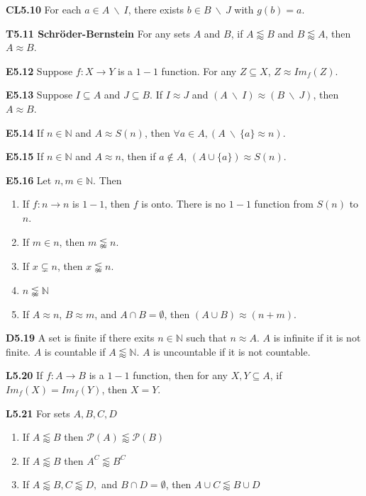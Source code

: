\documentclass[10pt, landscape]{article}
\begin{document}
\begin{multicols*}{3}
\textbf{CL5.10} For each $a \in A \ \backslash \ I$, there exists $b \in B \ \backslash \ J$ with $g(b)=a$.

\textbf{T5.11 Schröder-Bernstein} For any sets $A$ and $B$, if $A \lessapprox B$ and $B \lessapprox A$, then $A \approx B$.

\textbf{E5.12} Suppose $f:X \rightarrow Y$ is a $1-1$ function. For any $Z \subseteq X$, $Z \approx Im_f(Z)$.

\textbf{E5.13} Suppose $I \subseteq A$ and $J \subseteq B$. If $I \approx J$ and $(A \ \backslash \ I) \approx (B \ \backslash \ J)$, then $A \approx B$.

\textbf{E5.14} If $n \in \mathbb{N}$ and $A \approx S(n)$, then $\forall a \in A, ( A \ \backslash \ \{a\} \approx n)$.

\textbf{E5.15} If $n \in \mathbb{N}$ and $A \approx n$, then if $a \notin A$, $(A \cup \{a\}) \approx S(n)$.

\textbf{E5.16} Let $n, m \in \mathbb{N}$. Then
\begin{enumerate}
    \item If $f:n \rightarrow n$ is $1-1$, then $f$ is onto. There is no $1-1$ function from $S(n)$ to $n$.
    \item If $m \in n$, then $m \lnapprox n$.
    \item If $x \subsetneq n$, then $x \lnapprox n$.
    \item $n \lnapprox \mathbb{N}$
    \item If $A \approx n$, $B \approx m$, and $A \cap B = \emptyset$, then $(A \cup B) \approx (n+m)$.
\end{enumerate}

\textbf{D5.19} A set is finite if there exits $n \in \mathbb{N}$ such that $n \approx A$. $A$ is infinite if it is not finite. $A$ is countable if $A \lessapprox \mathbb{N}$. $A$ is uncountable if it is not countable.

\textbf{L5.20} If $f:A\rightarrow B$ is a $1-1$ function, then for any $X,Y\subseteq A$, if $Im_f(X)=Im_f(Y)$, then $X=Y$.

\textbf{L5.21} For sets $A,B,C,D$
\begin{enumerate}
    \item If $A \lessapprox B$ then $\mathcal{P}(A) \lessapprox \mathcal{P}(B)$
    \item If $A \lessapprox B$ then $A^C \lessapprox B^C$
    \item If $A \lessapprox B, C \lessapprox D,$ and $B \cap D = \emptyset$, then $A\cup C \lessapprox B \cup D$
\end{enumerate}


\end{multicols*}
\end{document}
